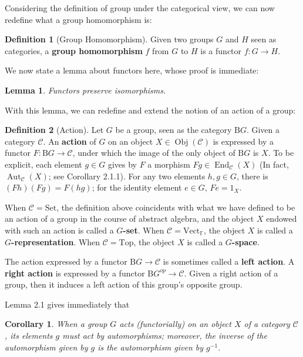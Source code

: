 \documentclass{article}
\newtheorem{corollary}{Corollary}[theorem]
\newtheorem{lemma}[theorem]{Lemma}
\theoremstyle{definition}
\newtheorem{definition}{Definition}[section]
\theoremstyle{definition}
\theoremstyle{remark}
\DeclareMathOperator{\Obj}{Obj}
\DeclareMathOperator{\End}{End}
\DeclareMathOperator{\Aut}{Aut}
\begin{document}
\par Considering the definition of group under the categorical view, we can now redefine what a group homomorphism is:
	\begin{definition}[Group Homomorphism]
	Given two groups $G$ and $H$ seen as categories, a \textbf{group homomorphism} $f$ from $G$ to $H$ is a functor $f:G\to H$.
	\end{definition}
	We now state a lemma about functors here, whose proof is immediate:
	\begin{lemma}
	Functors preserve isomorphisms.
	\end{lemma}
	With this lemma, we can redefine and extend the notion of an action of a group:
	\begin{definition}[Action]
	Let $G$ be a group, seen as the category $\mathrm{B}G$. Given a category $\mathcal{C}$. An \textbf{action} of $G$ on an object $X\in\Obj(\mathcal{C})$ is expressed by a functor $F:\mathrm{B}G\to \mathcal{C}$, under which the image of the only object of $\mathrm{B}G$ is $X$. To be explicit, each element $g\in G$ gives by $F$ a morphism $Fg\in\End_\mathcal{C}(X)$ (In fact, $\Aut_\mathcal{C}(X)$; see Corollary 2.1.1). For any two elements $h,g\in G$, there is $(Fh)(Fg)=F(hg)$; for the identity element $e\in G$, $Fe=1_X$.\par
	When $\mathcal{C}=\mathrm{Set}$, the definition above coincidents with what we have defined to be an action of a group in the course of abstract algebra, and the object $X$ endowed with such an action is called a $G$\textbf{-set}. When $\mathcal{C}=\mathrm{Vect}_\mathbb{F}$, the object $X$ is called a $G$\textbf{-representation}. When $\mathcal{C}=\mathrm{Top}$, the object $X$ is called a $G$\textbf{-space}.\par
	The action expressed by a functor $\mathrm{B}G\to \mathcal{C}$ is sometimes called a \textbf{left action}. A \textbf{right action} is expressed by a functor $\mathrm{B}G^{op}\to \mathcal{C}$. Given a right action of a group, then it induces a left action of this group's opposite group.
	\end{definition}
	Lemma 2.1 gives immediately that
	\begin{corollary}
	When a group $G$ acts (functorially) on an object $X$ of a category $\mathcal{C}$, its elements $g$ must act by automorphisms; moreover, the inverse of the automorphism given by $g$ is the automorphism given by $g^{-1}$.
	\end{corollary}
\end{document}

